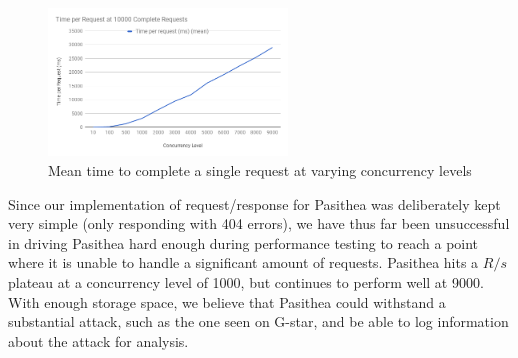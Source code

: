 \begin{figure}[t]
   \centering
   \includegraphics[width=2.5in]{images/TimeperRequest.png} 
   \caption{Mean time to complete a single request at varying concurrency levels}
   \label{fig:T/R}
\end{figure}

Since our implementation of request/response for Pasithea was deliberately kept very simple (only responding with 404 errors), we have thus far been unsuccessful in driving Pasithea hard enough during performance testing to reach a point where it is unable to handle a significant amount of requests.  
Pasithea hits a $R/s$ plateau at a concurrency level of 1000, but continues to perform well at 9000.
With enough storage space, we believe that Pasithea could withstand a substantial attack, such as the one seen on G-star, and be able to log information about the attack for analysis.
